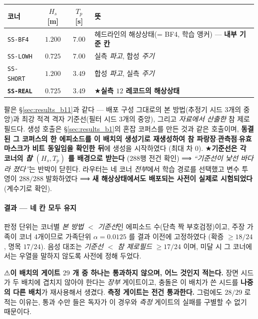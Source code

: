\documentclass[11pt]{report}
\numberwithin{equation}{chapter}
\numberwithin{figure}{chapter}
\numberwithin{table}{chapter}
\begin{document}
\begin{center}
\begin{tabular}{lccl}
\toprule
코너 & $H_s$ [m] & $T_p$ [s] & 뜻 \\
\midrule
\texttt{SS-BF4}   & $1.200$ & $7.00$ & 헤드라인의 해상상태(= BF4, 학습 앵커) --- \textbf{내부 기준 칸} \\
\texttt{SS-LOWH}  & $0.725$ & $7.00$ & 실측 \emph{파고}, 합성 \emph{주기} \\
\texttt{SS-SHORT} & $1.200$ & $3.49$ & 합성 \emph{파고}, 실측 \emph{주기} \\
\textbf{\texttt{SS-REAL}} & $\mathbf{0.725}$ & $\mathbf{3.49}$ & ★\textbf{실측 $12$ 레코드의 해상상태} \\
\bottomrule
\end{tabular}
\end{center}

팔은 \S\ref{sec:results_b11}과 같다 --- 배포 구성 그대로의 본 방법(추정기 시드
$3$개의 중앙)과 최강 적격 격자 기준선(필터 시드 $3$개의 중앙), 그리고 \emph{자료에서
산출한} 참 제로필드다. 생성 호출은 \S\ref{sec:results_b1}의 혼잡 코퍼스를 만든 것과
같은 호출이며, \textbf{동결된 그 코퍼스의 한 에피소드를 이 배치의 생성기로 재생성하여
참 파랑장$\cdot$관측점$\cdot$유효 마스크가 비트 동일임을 확인한 뒤}에 생성을 시작하였다
(최대 차 $0$). ★\textbf{기준선은 각 코너의 \emph{참} $(H_s, T_p)$ 를 배경으로 받는다}
($288$행 전건 확인) ⟹ \emph{``기준선이 낯선 바다라 졌다''}는 반박이 닫힌다.
라우터는 네 코너 \emph{전부}에서 학습 경로를 선택했고 변수 투영이 $288/288$ 발화하였다
⟹ \textbf{새 해상상태에서도 배포되는 사전이 실제로 시험되었다}(계수기로 확인).

\paragraph{결과 --- 네 칸 모두 유지}
판정 단위는 코너별 \emph{본 방법 $<$ 기준선}인 에피소드 수(단측 짝 부호검정)이고,
주장 가족이 코너 $4$개이므로 가족단위 $\alpha = 0.0125$ 를 결과 이전에 고정하였다
(확증 $\geq 18/24$, 명목 $17/24$). 음성 대조는 \emph{기준선 $<$ 참 제로필드}
$\geq 17/24$ 이며, 미달 시 그 코너에서는 우열을 말하지 않도록 사전에 정해 두었다.

⚠\textbf{이 배치의 게이트 $29$ 개 중 하나는 통과하지 않으며, 어느 것인지 적는다.}
장면 시드가 두 배치에 겹치지 않아야 한다는 \emph{장부} 게이트이고, 충돌은 이 배치가 쓴
시드를 \textbf{나중의 다른 배치}가 재사용해서 생겼다. \textbf{측정 게이트는 전건
통과한다.} 그럼에도 $28/29$ 로 적는 이유는, 통과 수만 들은 독자가 이 경우와 \emph{측정}
게이트의 실패를 구별할 수 없기 때문이다.
\end{document}
